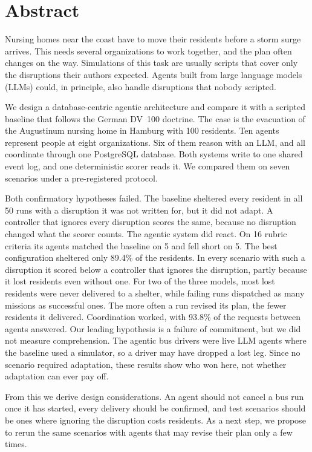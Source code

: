 \chapter*{Abstract}

Nursing homes near the coast have to move their residents before a storm surge
arrives. This needs several organizations to work together, and the plan often
changes on the way. Simulations of this task are usually scripts that cover
only the disruptions their authors expected. Agents built from large language
models (LLMs) could, in principle, also handle disruptions that nobody scripted.

We design a database-centric agentic architecture and compare it with a
scripted baseline that follows the German DV~100 doctrine. The case is the
evacuation of the Augustinum nursing home in Hamburg with 100 residents. Ten
agents represent people at eight organizations. Six of them reason with an
LLM, and all coordinate through one PostgreSQL database. Both systems write to
one shared event log, and one deterministic scorer reads it. We compared them
on seven scenarios under a pre-registered protocol.

Both confirmatory hypotheses failed. The baseline sheltered every resident
in all 50 runs with a disruption it was not written for, but it did not adapt.
A controller that ignores every disruption scores
the same, because no disruption changed what the scorer counts. The agentic
system did react. On 16 rubric criteria its agents matched the baseline on 5
and fell short on 5. The best configuration sheltered only 89.4\% of the
residents. In every scenario with such a disruption it scored below a
controller that ignores the disruption, partly because it lost residents even
without one. For two of the three models, most lost residents were never
delivered to a shelter, while failing runs dispatched as many missions as
successful ones. The more often a run revised its plan, the fewer residents it
delivered. Coordination worked, with 93.8\% of the requests between
agents answered. Our leading hypothesis is a failure of commitment, but we did
not measure comprehension. The agentic bus drivers were live LLM agents
where the baseline used a simulator, so a driver may have dropped a lost leg.
Since no
scenario required adaptation, these results show who won here, not whether
adaptation can ever pay off.

From this we derive design considerations. An agent should not cancel a bus run
once it has started, every delivery should be confirmed, and test scenarios
should be ones where ignoring the disruption costs residents. As a next step,
we propose to rerun the same scenarios with agents that may revise their plan
only a few times.

